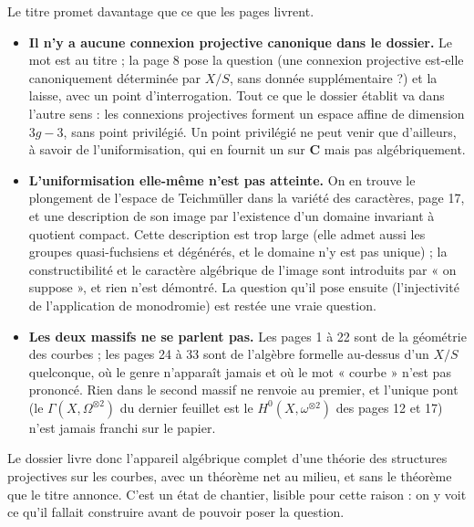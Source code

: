 \documentclass[11pt,a4paper]{article}
\begin{document}
Le titre promet davantage que ce que les pages livrent.

\begin{itemize}
\item \textbf{Il n'y a aucune connexion projective canonique dans le dossier.}
Le mot est au titre ; la page 8 pose la question (une connexion projective
est-elle canoniquement déterminée par $X/S$, sans donnée supplémentaire ?) et
la laisse, avec un point d'interrogation. Tout ce que le dossier établit va
dans l'autre sens : les connexions projectives forment un espace affine de
dimension $3g-3$, sans point privilégié. Un point privilégié ne peut venir que
d'ailleurs, à savoir de l'uniformisation, qui en fournit un sur
$\mathbf{C}$ mais pas algébriquement.
\item \textbf{L'uniformisation elle-même n'est pas atteinte.} On en
trouve le plongement de l'espace de Teichmüller dans la variété des
caractères, page 17, et une description de son image par l'existence d'un
domaine invariant à quotient compact. Cette description est trop large (elle
admet aussi les groupes quasi-fuchsiens et dégénérés, et le domaine n'y est
pas unique) ; la constructibilité et le caractère algébrique de l'image sont
introduits par « on suppose », et rien n'est démontré. La question qu'il pose ensuite (l'injectivité de l'application de
monodromie) est restée une vraie question.
\item \textbf{Les deux massifs ne se parlent pas.} Les pages 1 à 22 sont de la
géométrie des courbes ; les pages 24 à 33 sont de l'algèbre formelle
au-dessus d'un $X/S$ quelconque, où le genre n'apparaît jamais et où le mot
« courbe » n'est pas prononcé. Rien dans le second massif ne renvoie au
premier, et l'unique pont (le $\Gamma(X,\Omega^{\otimes 2})$ du dernier
feuillet est le $H^0(X, \omega^{\otimes 2})$ des pages 12 et 17) n'est
jamais franchi sur le papier.
\end{itemize}

Le dossier livre donc l'appareil algébrique complet d'une
théorie des structures projectives sur les courbes, avec un théorème net au
milieu, et sans le théorème que le titre annonce. C'est un état de chantier,
lisible pour cette raison : on y voit ce qu'il fallait construire avant de
pouvoir poser la question.
\end{document}
